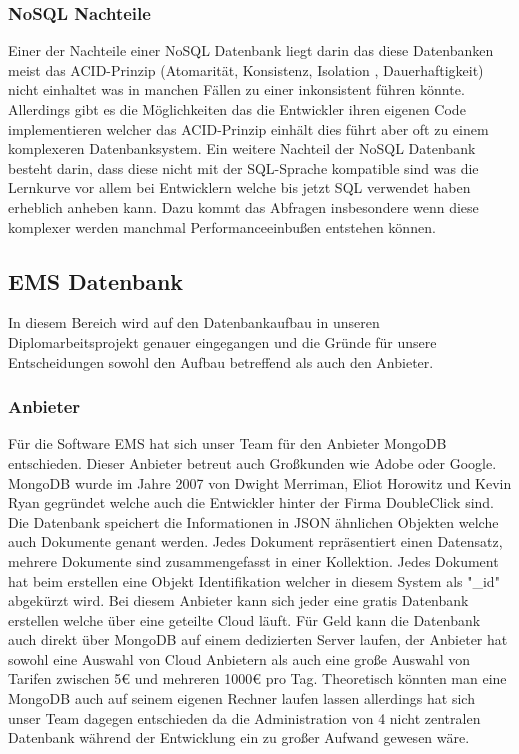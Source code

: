	\subsubsection{NoSQL Nachteile}
		Einer der Nachteile einer NoSQL Datenbank liegt darin das diese Datenbanken meist das ACID-Prinzip (Atomarität, Konsistenz, Isolation , Dauerhaftigkeit) nicht einhaltet was in manchen Fällen zu einer inkonsistent führen könnte. Allerdings gibt es die Möglichkeiten das die Entwickler ihren eigenen Code implementieren welcher das ACID-Prinzip einhält dies führt aber oft zu einem komplexeren Datenbanksystem. Ein weitere Nachteil der NoSQL Datenbank besteht darin, dass diese nicht mit der SQL-Sprache kompatible sind was die Lernkurve vor allem bei Entwicklern welche bis jetzt SQL verwendet haben erheblich anheben kann. Dazu kommt das Abfragen insbesondere wenn diese komplexer werden manchmal Performanceeinbußen entstehen können.
		
	\subsection{EMS Datenbank}
		In diesem Bereich wird auf den Datenbankaufbau in unseren Diplomarbeitsprojekt genauer eingegangen und die Gründe für unsere Entscheidungen sowohl den Aufbau betreffend als auch den Anbieter.
		
		\subsubsection{Anbieter}
			Für die Software EMS hat sich unser Team für den Anbieter MongoDB entschieden. Dieser Anbieter betreut auch Großkunden wie Adobe oder Google. MongoDB wurde im Jahre 2007 von Dwight Merriman, Eliot Horowitz und Kevin Ryan gegründet welche auch die Entwickler hinter der Firma DoubleClick sind. Die Datenbank speichert die Informationen in JSON ähnlichen Objekten welche auch Dokumente genant werden. Jedes Dokument repräsentiert einen Datensatz, mehrere Dokumente sind zusammengefasst in einer Kollektion. Jedes Dokument hat beim erstellen eine Objekt Identifikation welcher in diesem System als "\_id" abgekürzt wird. Bei diesem Anbieter kann sich jeder eine gratis Datenbank erstellen welche über eine geteilte Cloud läuft. Für Geld kann die Datenbank auch direkt über MongoDB auf einem dedizierten Server laufen, der Anbieter hat sowohl eine Auswahl von Cloud Anbietern als auch eine große Auswahl von Tarifen zwischen 5€ und mehreren 1000€ pro Tag. Theoretisch könnten man eine MongoDB auch auf seinem eigenen Rechner laufen lassen allerdings hat sich unser Team dagegen entschieden da die Administration von 4 nicht zentralen Datenbank während der Entwicklung ein zu großer Aufwand gewesen wäre.
		

